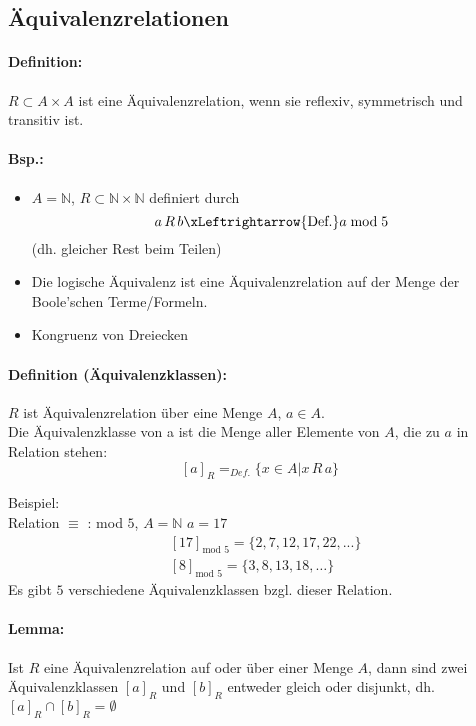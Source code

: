 \subsection{Äquivalenzrelationen}
\paragraph{Definition:} $R\subset A\times A$ ist eine Äquivalenzrelation, wenn sie reflexiv, symmetrisch und transitiv ist.

\paragraph{Bsp.:}
\begin{itemize}
\item $A=\mathbb{N}$, $R\subset\mathbb{N}\times\mathbb{N}$ definiert durch
\[
a\,R\,b \xLeftrightarrow{\text{Def.}} a\bmod 5
\]
(dh. gleicher Rest beim Teilen)
\item Die logische Äquivalenz ist eine Äquivalenzrelation auf der Menge der Boole'schen Terme/Formeln.
\item Kongruenz von Dreiecken
\end{itemize}

\paragraph{Definition (Äquivalenzklassen):}$R$ ist \"Aquivalenzrelation \"uber eine Menge $A$, $a\in A$.\\
Die \"Aquivalenzklasse von a ist die Menge aller Elemente von $A$, die zu $a$ in Relation stehen:
\[
[a]_{R} =_{Def.} \{x \in A | x\,R\,a\}
\]

Beispiel:\\
Relation $\equiv$ : mod $5$, $A = \mathbb{N}$ $a=17$
\begin{align*}
&[17]_{\text{mod }5} = \{2,7,12,17,22,...\} \\
&[8]_{\text{mod }5} = \{3,8,13,18, \ldots\}
\end{align*}
Es gibt $5$ verschiedene \"Aquivalenzklassen bzgl. dieser Relation.

\paragraph{Lemma: } Ist $R$ eine \"Aquivalenzrelation auf oder \"uber einer Menge $A$, dann sind zwei \"Aquivalenzklassen $[a]_R$ und $[b]_R$ entweder gleich oder disjunkt, dh. $[a]_R \cap [b]_R = \emptyset$

